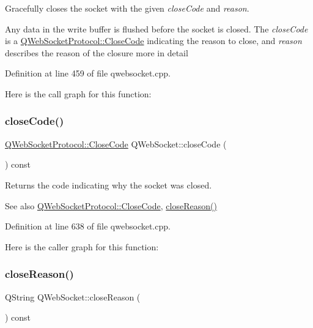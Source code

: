 Gracefully closes the socket with the given {\itshape close\+Code} and {\itshape reason}. 

Any data in the write buffer is flushed before the socket is closed. The {\itshape close\+Code} is a \mbox{\hyperlink{namespace_q_web_socket_protocol_a9f236676f594451d8d723f260b71028c}{Q\+Web\+Socket\+Protocol\+::\+Close\+Code}} indicating the reason to close, and {\itshape reason} describes the reason of the closure more in detail 

Definition at line 459 of file qwebsocket.\+cpp.

Here is the call graph for this function\+:
\mbox{\label{class_q_web_socket_ac0392e28fa81d5452868813d5e907d71}} 
\subsubsection{\texorpdfstring{close\+Code()}{closeCode()}}
{\footnotesize\ttfamily \mbox{\hyperlink{namespace_q_web_socket_protocol_a9f236676f594451d8d723f260b71028c}{Q\+Web\+Socket\+Protocol\+::\+Close\+Code}} Q\+Web\+Socket\+::close\+Code (\begin{DoxyParamCaption}{ }\end{DoxyParamCaption}) const}



Returns the code indicating why the socket was closed. 

\begin{DoxySeeAlso}{See also}
\mbox{\hyperlink{namespace_q_web_socket_protocol_a9f236676f594451d8d723f260b71028c}{Q\+Web\+Socket\+Protocol\+::\+Close\+Code}}, \mbox{\hyperlink{class_q_web_socket_a64964f85bc0736ee350975ca6e47c3fe}{close\+Reason()}} 
\end{DoxySeeAlso}


Definition at line 638 of file qwebsocket.\+cpp.

Here is the caller graph for this function\+:
\mbox{\label{class_q_web_socket_a64964f85bc0736ee350975ca6e47c3fe}} 
\subsubsection{\texorpdfstring{close\+Reason()}{closeReason()}}
{\footnotesize\ttfamily Q\+String Q\+Web\+Socket\+::close\+Reason (\begin{DoxyParamCaption}{ }\end{DoxyParamCaption}) const}



